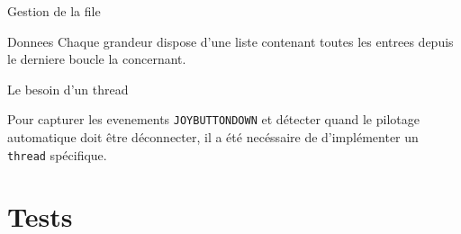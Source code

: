 \documentclass[tikz, footheight=2em]{beamer}
\begin{document}
\begin{frame}[t]{Gestion de la file}
  \begin{block}{Donnees}
    Chaque grandeur dispose d'une liste contenant toutes les entrees depuis le
    derniere boucle la concernant.
  \end{block}
\end{frame}

\begin{frame}[t]{Le besoin d'un thread}
  \begin{block}{\texttt{}}
    Pour capturer les evenements \texttt{JOYBUTTONDOWN} et détecter quand le
    pilotage automatique doit être déconnecter, il a été necéssaire de d'implémenter
    un \texttt{thread} spécifique.
  \end{block}
\end{frame}


\section{Tests}
\end{document}
